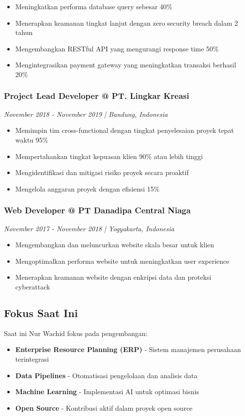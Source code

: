 \begin{itemize}
\item Meningkatkan performa database query sebesar 40\%
\item Menerapkan keamanan tingkat lanjut dengan zero security breach dalam 2 tahun
\item Mengembangkan RESTful API yang mengurangi response time 50\%
\item Mengintegrasikan payment gateway yang meningkatkan transaksi berhasil 20\%
\end{itemize}

\subsubsection*{Project Lead Developer @ PT. Lingkar Kreasi}
\textit{November 2018 - November 2019 | Bandung, Indonesia}

\begin{itemize}
\item Memimpin tim cross-functional dengan tingkat penyelesaian proyek tepat waktu 95\%
\item Mempertahankan tingkat kepuasan klien 90\% atau lebih tinggi
\item Mengidentifikasi dan mitigasi risiko proyek secara proaktif
\item Mengelola anggaran proyek dengan efisiensi 15\%
\end{itemize}

\subsubsection*{Web Developer @ PT Danadipa Central Niaga}
\textit{November 2017 - November 2018 | Yogyakarta, Indonesia}

\begin{itemize}
\item Mengembangkan dan meluncurkan website skala besar untuk klien
\item Mengoptimalkan performa website untuk meningkatkan user experience
\item Menerapkan keamanan website dengan enkripsi data dan proteksi cyberattack
\end{itemize}

\subsection*{Fokus Saat Ini}

Saat ini Nur Wachid fokus pada pengembangan:
\begin{itemize}
\item \textbf{Enterprise Resource Planning (ERP)} - Sistem manajemen perusahaan terintegrasi
\item \textbf{Data Pipelines} - Otomatisasi pengelolaan dan analisis data
\item \textbf{Machine Learning} - Implementasi AI untuk optimasi bisnis
\item \textbf{Open Source} - Kontribusi aktif dalam proyek open source
\end{itemize}

